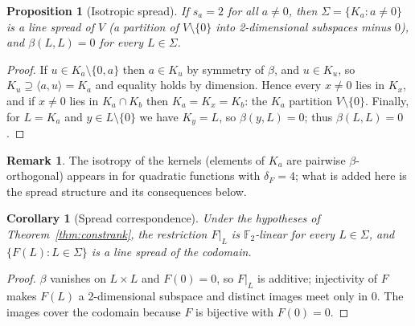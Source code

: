 \documentclass[11pt]{article}
\newtheorem{proposition}[theorem]{Proposition}
\newtheorem{corollary}[theorem]{Corollary}
\theoremstyle{definition}
\newtheorem{remark}[theorem]{Remark}
\newcommand{\F}{\mathbb{F}}
\begin{document}
\begin{proposition}[Isotropic spread]\label{prop:spread}
If $s_a=2$ for all $a\neq 0$, then $\Sigma=\{K_a:a\neq 0\}$ is a line spread of $V$
(a partition of $V\setminus\{0\}$ into 2-dimensional subspaces minus $0$), and
$\beta(L,L)=0$ for every $L\in\Sigma$.
\end{proposition}
\begin{proof}
If $u\in K_a\setminus\{0,a\}$ then $a\in K_u$ by symmetry of $\beta$, and $u\in K_u$, so
$K_u\supseteq\langle a,u\rangle=K_a$ and equality holds by dimension. Hence every
$x\neq 0$ lies in $K_x$, and if $x\neq 0$ lies in $K_a\cap K_b$ then $K_a=K_x=K_b$: the
$K_a$ partition $V\setminus\{0\}$. Finally, for $L=K_a$ and $y\in L\setminus\{0\}$ we have
$K_y=L$, so $\beta(y,L)=0$; thus $\beta(L,L)=0$.
\end{proof}
\begin{remark}
The isotropy of the kernels (elements of $K_a$ are pairwise $\beta$-orthogonal) appears in
\cite[Lemma~1]{MTX19} for quadratic functions with $\delta_F=4$; what is added here is the
spread structure and its consequences below.
\end{remark}

\begin{corollary}[Spread correspondence]\label{cor:spread-map}
Under the hypotheses of Theorem~\ref{thm:constrank}, the restriction $F|_L$ is $\F_2$-linear for
every $L\in\Sigma$, and $\{F(L):L\in\Sigma\}$ is a line spread of the codomain.
\end{corollary}
\begin{proof}
$\beta$ vanishes on $L\times L$ and $F(0)=0$, so $F|_L$ is additive; injectivity of $F$
makes $F(L)$ a 2-dimensional subspace and distinct images meet only in $0$. The images
cover the codomain because $F$ is bijective with $F(0)=0$.
\end{proof}
\end{document}

